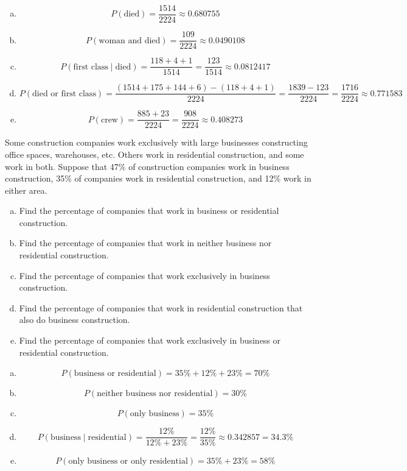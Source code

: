 \documentclass[11pt,letterpaper]{article}
\begin{document}
\sol 
\begin{enumerate}[(a)]
\item 
	\[
	P(\text{died})= \dfrac{1514}{2224} \approx 0.680755
	\]

\item 
	\[
	P(\text{woman and died})= \dfrac{109}{2224} \approx 0.0490108
	\]

\item 
	\[
	P(\text{first class} \;|\; \text{died})= \dfrac{118 + 4 + 1}{1514}= \dfrac{123}{1514} \approx 0.0812417
	\]

\item 
	\[
	P(\text{died or first class})= \dfrac{(1514 + 175 + 144 + 6) - (118 + 4 + 1)}{2224}= \dfrac{1839 - 123}{2224}= \dfrac{1716}{2224} \approx 0.771583
	\]

\item 
	\[
	P(\text{crew})= \dfrac{885 + 23}{2224}= \dfrac{908}{2224} \approx 0.408273
	\]
\end{enumerate}


\newpage



 Some construction companies work exclusively with large businesses constructing office spaces, warehouses, etc. Others work in residential construction, and some work in both. Suppose that 47\% of construction companies work in business construction, 35\% of companies work in residential construction, and 12\% work in either area. 
        \begin{enumerate}[(a)]
        \item Find the percentage of companies that work in business or residential construction.
        \item Find the percentage of companies that work in neither business nor residential construction.
        \item Find the percentage of companies that work exclusively in business construction.
        \item Find the percentage of companies that work in residential construction that also do business construction.
        \item Find the percentage of companies that work exclusively in business or residential construction. 
        \end{enumerate} \pspace

\sol 
\begin{enumerate}[(a)]
\item 
	\[
	P(\text{business or residential})= 35\% + 12\% + 23\%= 70\%
	\]

\item 
	\[
	P(\text{neither business nor residential})= 30\%
	\]
 
\item 
	\[
	P(\text{only business})= 35\%
	\]
  
\item 
	\[
	P(\text{business} \;|\; \text{residential})= \dfrac{12\%}{12\% + 23\%}= \dfrac{12\%}{35\%} \approx 0.342857= 34.3\%
	\]
  
\item 
	\[
	P(\text{only business or only residential})= 35\% + 23\%= 58\%
	\] 
\end{enumerate} \vfill
\end{document}
